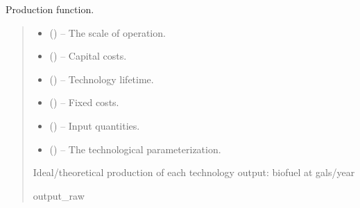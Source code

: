 \documentclass[letterpaper,10pt,english]{sphinxmanual}
\begin{document}
\begin{fulllineitems}
\label{\detokenize{technology:technology.tutorial_biorefinery.production}}
\pysigstartsignatures
{}
\pysigstopsignatures
\sphinxAtStartPar
Production function.
\begin{quote}\begin{description}
\begin{itemize}
\item {} 
\sphinxAtStartPar
{} () – The scale of operation.

\item {} 
\sphinxAtStartPar
{} () – Capital costs.

\item {} 
\sphinxAtStartPar
{} () – Technology lifetime.

\item {} 
\sphinxAtStartPar
{} () – Fixed costs.

\item {} 
\sphinxAtStartPar
{} () – Input quantities.

\item {} 
\sphinxAtStartPar
{} () – The technological parameterization.

\end{itemize}

\sphinxAtStartPar
Ideal/theoretical production of each technology output: biofuel at
gals/year

\sphinxAtStartPar
output\_raw

\end{description}\end{quote}

\end{fulllineitems}
\end{document}
